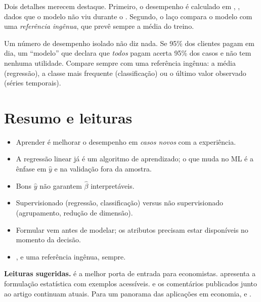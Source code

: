 Dois detalhes merecem destaque. Primeiro, o desempenho é calculado em
, , dados que o modelo não viu durante o .
Segundo, o laço compara o modelo com uma \emph{referência ingênua}, que prevê
sempre a média do treino.

\begin{atencao}
Um número de desempenho isolado não diz nada. Se 95\% dos clientes pagam em
dia, um ``modelo'' que declara que \emph{todos} pagam acerta 95\% dos casos e
não tem nenhuma utilidade. Compare sempre com uma referência ingênua: a média
(regressão), a classe mais frequente (classificação) ou o último valor
observado (séries temporais).
\end{atencao}

\section{Resumo e leituras}

\begin{itemize}[nosep]
  \item Aprender é melhorar o desempenho em \emph{casos novos} com a experiência.
  \item A regressão linear já é um algoritmo de aprendizado; o que muda no ML é a
        ênfase em $\hat y$ e na validação fora da amostra.
  \item Bons $\hat y$ não garantem $\hat\beta$ interpretáveis.
  \item Supervisionado (regressão, classificação) versus não supervisionado
        (agrupamento, redução de dimensão).
  \item Formular vem antes de modelar; os atributos precisam estar disponíveis no
        momento da decisão.
  \item {},  e uma referência ingênua, sempre.
\end{itemize}

\noindent\textbf{Leituras sugeridas.} \textcite{mullainathan2017} é a melhor
porta de entrada para economistas. \textcite[cap.~2]{james2021} apresenta a
formulação estatística com exemplos acessíveis. \textcite{breiman2001cultures}
e os comentários publicados junto ao artigo continuam atuais. Para um panorama
das aplicações em economia, \textcite{athey2019} e \textcite{varian2014}.
